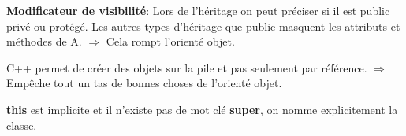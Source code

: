 \textbf{Modificateur de visibilité}: Lors de l’héritage on peut préciser si il est public privé ou protégé. Les autres types d’héritage que public masquent les attributs et méthodes de A. $\Rightarrow$ Cela rompt l’orienté objet.

C++ permet de créer des objets sur la pile et pas seulement par référence. $\Rightarrow$ Empêche tout un tas de bonnes choses de l’orienté objet.

\textbf{this} est implicite et il n'existe pas de mot clé \textbf{super}, on nomme explicitement la classe.